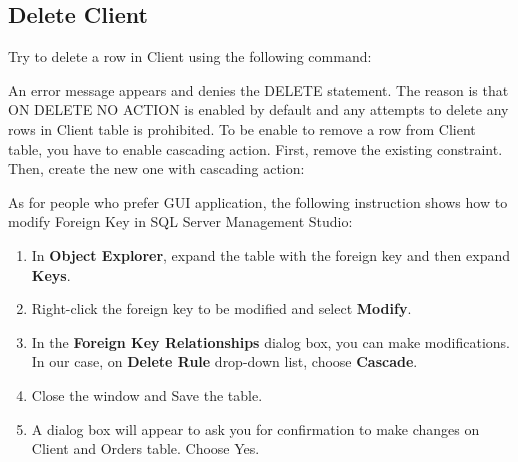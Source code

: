 \documentclass[10pt,a4paper]{article}
\begin{document}
\subsection{Delete Client} Try to delete a row in Client using the following command:

An error message appears and denies the DELETE statement. The reason is that ON DELETE NO ACTION is enabled by default and any attempts to delete any rows in Client table is prohibited. To be enable to remove a row from Client table, you have to enable cascading action. First, remove the existing constraint. Then, create the new one with cascading action:

As for people who prefer GUI application, the following instruction shows how to modify Foreign Key in SQL Server Management Studio:
\begin{enumerate}
\item In \textbf{Object Explorer}, expand the table with the foreign key and then expand \textbf{Keys}.
\item Right-click the foreign key to be modified and select \textbf{Modify}. 
\item In the \textbf{Foreign Key Relationships} dialog box, you can make modifications. In our case, on \textbf{Delete Rule} drop-down list, choose \textbf{Cascade}.
\item Close the window and Save the table.
\item A dialog box will appear to ask you for confirmation to make changes on Client and Orders table. Choose Yes.
\end{enumerate}
\end{document}
